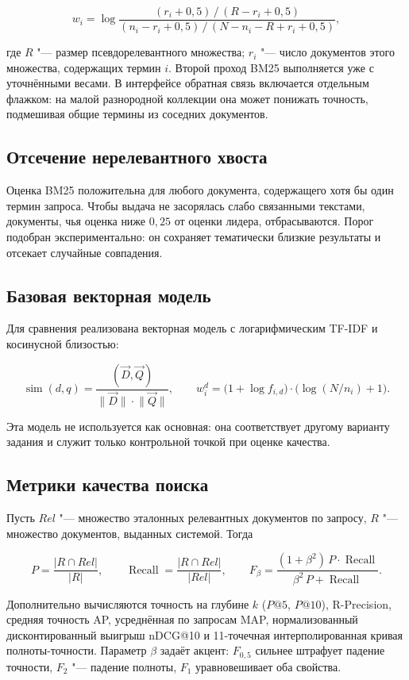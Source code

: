 \begin{equation}
	w_i = \log\frac{(r_i + 0{,}5)\,/\,(R - r_i + 0{,}5)}
	{(n_i - r_i + 0{,}5)\,/\,(N - n_i - R + r_i + 0{,}5)},
	\label{eq:rsj-prf}
\end{equation}

где $R$ "--- размер псевдорелевантного множества; $r_i$ "--- число документов этого множества, содержащих термин $i$. Второй проход BM25 выполняется уже с уточнёнными весами. В интерфейсе обратная связь включается отдельным флажком: на малой разнородной коллекции она может понижать точность, подмешивая общие термины из соседних документов.

\subsection{Отсечение нерелевантного хвоста}

Оценка BM25 положительна для любого документа, содержащего хотя бы один термин запроса. Чтобы выдача не засорялась слабо связанными текстами, документы, чья оценка ниже $0{,}25$ от оценки лидера, отбрасываются. Порог подобран экспериментально: он сохраняет тематически близкие результаты и отсекает случайные совпадения.

\subsection{Базовая векторная модель}

Для сравнения реализована векторная модель с логарифмическим TF-IDF и косинусной близостью:

\begin{equation}
	\operatorname{sim}(d,q) = \frac{(\vec{D},\vec{Q})}{\lVert\vec{D}\rVert\cdot\lVert\vec{Q}\rVert},
	\qquad
	w^{d}_{i} = \bigl(1 + \log f_{i,d}\bigr)\cdot\bigl(\log(N/n_i) + 1\bigr).
	\label{eq:tfidf}
\end{equation}

Эта модель не используется как основная: она соответствует другому варианту задания и служит только контрольной точкой при оценке качества.

\subsection{Метрики качества поиска}

Пусть $Rel$ "--- множество эталонных релевантных документов по запросу, $R$ "--- множество документов, выданных системой. Тогда

\begin{equation}
	P = \frac{|R \cap Rel|}{|R|},
	\qquad
	\operatorname{Recall} = \frac{|R \cap Rel|}{|Rel|},
	\qquad
	F_{\beta} = \frac{(1 + \beta^{2})\,P\cdot\operatorname{Recall}}{\beta^{2}\,P + \operatorname{Recall}}.
	\label{eq:prf}
\end{equation}

Дополнительно вычисляются точность на глубине $k$ ($P@5$, $P@10$), R-Precision, средняя точность AP, усреднённая по запросам MAP, нормализованный дисконтированный выигрыш nDCG@10 и 11-точечная интерполированная кривая полноты-точности. Параметр $\beta$ задаёт акцент: $F_{0{,}5}$ сильнее штрафует падение точности, $F_2$ "--- падение полноты, $F_1$ уравновешивает оба свойства.
